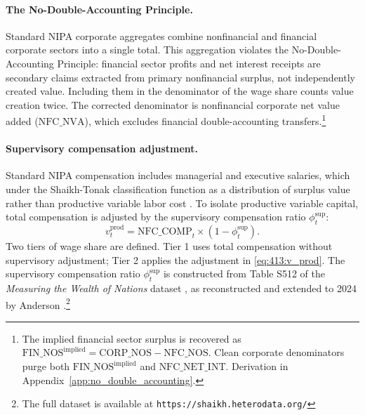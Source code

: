 \paragraph{The No-Double-Accounting Principle.}
Standard NIPA corporate aggregates combine nonfinancial and
financial corporate sectors into a single total. This aggregation
violates the No-Double-Accounting Principle: financial sector
profits and net interest receipts are secondary claims extracted
from primary nonfinancial surplus, not independently created value.
Including them in the denominator of the wage share counts value
creation twice. The corrected denominator is nonfinancial corporate
net value added ($\text{NFC\_NVA}$), which excludes financial
double-accounting transfers.\footnote{The implied financial sector
	surplus is recovered as $\text{FIN\_NOS}^{\text{implied}} =
	\text{CORP\_NOS} - \text{NFC\_NOS}$. Clean corporate denominators
	purge both $\text{FIN\_NOS}^{\text{implied}}$ and
	$\text{NFC\_NET\_INT}$. Derivation in
	Appendix~\ref{app:no_double_accounting}.}

\paragraph{Supervisory compensation adjustment.}
Standard NIPA compensation includes managerial and executive
salaries, which under the Shaikh-Tonak classification function as a
distribution of surplus value rather than productive variable labor
cost \citep{ShaikhTonak1994}. To isolate productive variable
capital, total compensation is adjusted by the supervisory
compensation ratio $\phi^{\text{sup}}_t$:
\begin{equation}
	v^{\text{prod}}_t =
	\text{NFC\_COMP}_t \times
	\left(1 - \phi^{\text{sup}}_t\right).
	\label{eq:413:v_prod}
\end{equation}
Two tiers of wage share are defined. Tier 1 uses total compensation
without supervisory adjustment; Tier 2 applies the adjustment in
\eqref{eq:413:v_prod}. The supervisory compensation ratio $\phi^{\text{sup}}_t$ is
constructed from Table S512 of the \textit{Measuring the Wealth of
	Nations} dataset \citep{ShaikhTonak1994}, as reconstructed and
extended to 2024 by Anderson \citep{ShaikhData2024}.\footnote{The
	full dataset is available at \texttt{https://shaikh.heterodata.org/}}


